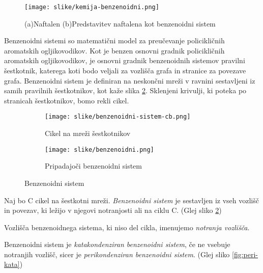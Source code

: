 \documentclass[mat1, tisk]{fmfdelo}
\begin{document}
\begin{figure}[ht!]
    \centering
    \texttt{[image: slike/kemija-benzenoidni.png]}
    \caption{(a)Naftalen (b)Predstavitev naftalena kot benzenoidni sistem}
    \label{fig:naftalen-kot-benzenoidni}
\end{figure}




Benzenoidni sistemi so matematični model za preučevanje policikličnih aromatskih ogljikovodikov.
Kot je benzen osnovni gradnik policikličnih aromatskih ogljikovodikov, 
je osnovni gradnik benzenoidnih sistemov pravilni šestkotnik,
katerega koti bodo veljali za vozlišča grafa in stranice za povezave grafa.
Benzenoidni sistem je definiran na neskončni mreži v ravnini 
sestavljeni iz samih pravilnih šestkotnikov, kot kaže slika \ref{fig:benzenoidni-sistem}.
Sklenjeni krivulji, ki poteka po stranicah šestkotnikov, bomo rekli cikel.

\begin{figure}[ht!]
    \centering
    \begin{subfigure}{.5\textwidth}
      \centering
      \texttt{[image: slike/benzenoidni-sistem-cb.png]}
      \caption{Cikel na mreži šestkotnikov}
    \end{subfigure}%
    \begin{subfigure}{.5\textwidth}
      \centering
      \texttt{[image: slike/benzenoidni.png]}
      \caption{Pripadajoči benzenoidni sistem}
    \end{subfigure}
    \caption{Benzenoidni sistem}
    \label{fig:benzenoidni-sistem}
\end{figure}  


\begin{definicija}
  Naj bo C cikel na šestkotni mreži. \emph{Benzenoidni sistem} je sestavljen 
  iz vseh vozlišč in povezav, ki ležijo v njegovi notranjosti ali na ciklu C.
   (Glej sliko \ref{fig:benzenoidni-sistem})
\end{definicija}

Vozlišča benzenoidnega sistema, ki niso del cikla, imenujemo \emph{notranja vozlišča}.

\begin{definicija}
  Benzenoidni sistem je \emph{katakondenziran benzenoidni sistem}, če ne vsebuje notranjih vozlišč,
  sicer je \emph{perikondenziran benzenoidni sistem}.
   (Glej sliko \ref{fig:peri-kata})
\end{definicija}
\end{document}
